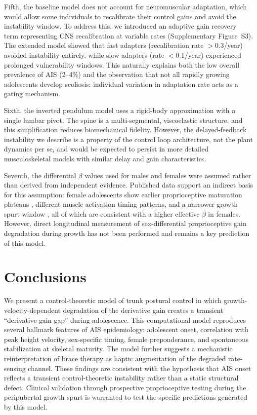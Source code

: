 \documentclass[12pt,a4paper]{article}
\begin{document}
Fifth, the baseline model does not account for neuromuscular adaptation, which would allow some individuals to recalibrate their control gains and avoid the instability window. To address this, we introduced an adaptive gain recovery term representing CNS recalibration at variable rates (Supplementary Figure~S3). The extended model showed that fast adapters (recalibration rate $> 0.3$/year) avoided instability entirely, while slow adapters (rate $< 0.1$/year) experienced prolonged vulnerability windows. This naturally explains both the low overall prevalence of AIS (2--4\%) and the observation that not all rapidly growing adolescents develop scoliosis: individual variation in adaptation rate acts as a gating mechanism.

Sixth, the inverted pendulum model uses a rigid-body approximation with a single lumbar pivot. The spine is a multi-segmental, viscoelastic structure, and this simplification reduces biomechanical fidelity. However, the delayed-feedback instability we describe is a property of the control loop architecture, not the plant dynamics per se, and would be expected to persist in more detailed musculoskeletal models with similar delay and gain characteristics.

Seventh, the differential $\beta$ values used for males and females were assumed rather than derived from independent evidence. Published data support an indirect basis for this assumption: female adolescents show earlier proprioceptive maturation plateaus \citep{hirabayashi2009age}, different muscle activation timing patterns, and a narrower growth spurt window \citep{tanner1966growth}, all of which are consistent with a higher effective $\beta$ in females. However, direct longitudinal measurement of sex-differential proprioceptive gain degradation during growth has not been performed and remains a key prediction of this model.

\section{Conclusions}

We present a control-theoretic model of trunk postural control in which growth-velocity-dependent degradation of the derivative gain creates a transient ``derivative gain gap'' during adolescence. This computational model reproduces several hallmark features of AIS epidemiology: adolescent onset, correlation with peak height velocity, sex-specific timing, female preponderance, and spontaneous stabilization at skeletal maturity. The model further suggests a mechanistic reinterpretation of brace therapy as haptic augmentation of the degraded rate-sensing channel. These findings are consistent with the hypothesis that AIS onset reflects a transient control-theoretic instability rather than a static structural defect. Clinical validation through prospective proprioceptive testing during the peripubertal growth spurt is warranted to test the specific predictions generated by this model.
\end{document}
